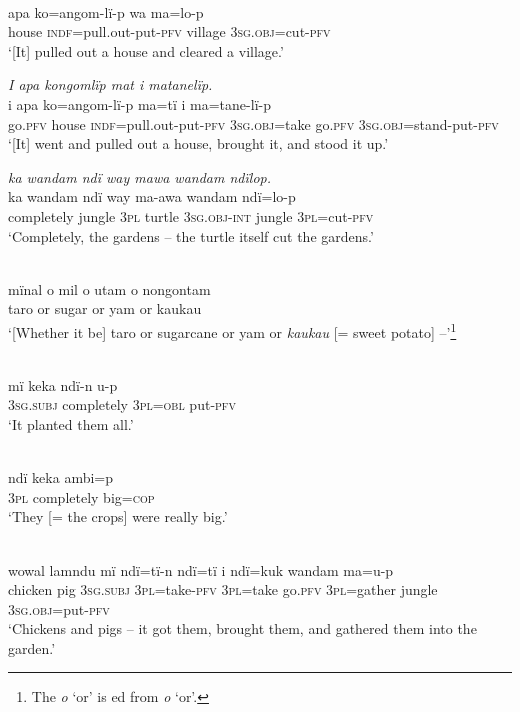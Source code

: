 \\
\gll apa    ko=angom{{}-}l{ï-}p      wa    ma=lo-p\\
house  \textsc{indf}=pull.out-put-\textsc{pfv}  village  3\textsc{sg.obj}=cut-\textsc{pfv}\\
\glt ‘[It] pulled out a house and cleared a village.’

\ex \textit{I apa kongomlïp mat i matan}{\textit{e}}\textit{lïp.}\\
\gll i    apa    ko=angom{{}-}lï-p      ma{=}tï      i ma{=}tan{e-}l{ï-}p\\
go.\textsc{pfv}  house  \textsc{indf=}pull.out-put-\textsc{pfv}  3\textsc{sg.obj}=take  go.\textsc{pfv} 3\textsc{sg.obj}=stand-put-\textsc{pfv}\\
\glt ‘[It] went and pulled out a house, brought it, and stood it up.’

\textit{ka wandam ndï way mawa wandam nd}{\textit{ï}}\textit{lop.}\\
ka      wandam  ndï  way  ma-awa    wandam  nd{ï=}lo-p\\
completely  jungle    3\textsc{pl}  turtle  3\textsc{sg.obj-int}  jungle    3\textsc{pl}=cut-\textsc{pfv}\\
\glt ‘Completely, the gardens -- the turtle itself cut the gardens.’

\\
\gll mïnal  o  mil    o  utam  {o} nongontam\\
taro  or  sugar  or  yam  or  kaukau\\
\glt ‘[Whether it be] taro or sugarcane or yam or \textit{kaukau} [= sweet potato] --’\footnote{The  \textit{o} ‘or’ is ed from  \textit{o} ‘or’.}

\\
\gll mï      keka      ndï{{}-}n    u-p\\
3\textsc{sg.subj}  completely  3\textsc{pl=obl}  put-\textsc{pfv}\\
\glt ‘It planted them all.’

\\
\gll ndï  keka      ambi=p\\
3\textsc{pl}  completely  big=\textsc{cop}\\
\glt ‘They [= the crops] were really big.’

\\
\gll wowal    lamndu  mï      ndï{=}tï{{}-}n    ndï{=}t{ï} i ndï=kuk    wandam  m{a=u-}p\\
chicken  pig      3\textsc{sg.subj}  3\textsc{pl}=take-\textsc{pfv}  3\textsc{pl}=take  go.\textsc{pfv} 3\textsc{pl}=gather  jungle    3\textsc{sg.obj}=put-\textsc{pfv}\\
\glt ‘Chickens and pigs -- it got them, brought them, and gathered them into the garden.’

